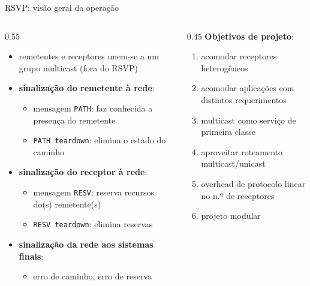 \documentclass[aspectratio=169,11pt]{beamer}
\begin{document}
\begin{frame}{RSVP: visão geral da operação}
  \begin{columns}
    \begin{column}{0.55\textwidth}
      \begin{itemize}
        \item remetentes e receptores unem-se a um grupo multicast (fora do RSVP)
        \item \textbf{sinalização do remetente à rede}:
          \begin{itemize}
            \item mensagem \texttt{PATH}: faz conhecida a presença do remetente
            \item \texttt{PATH teardown}: elimina o estado do caminho
          \end{itemize}
        \item \textbf{sinalização do receptor à rede}:
          \begin{itemize}
            \item mensagem \texttt{RESV}: reserva recursos do(s) remetente(s)
            \item \texttt{RESV teardown}: elimina reservas
          \end{itemize}
        \item \textbf{sinalização da rede aos sistemas finais}:
          \begin{itemize}
            \item erro de caminho, erro de reserva
          \end{itemize}
      \end{itemize}
    \end{column}
    \begin{column}{0.45\textwidth}
      \textbf{Objetivos de projeto}:
      \begin{enumerate}
        \item acomodar receptores heterogêneos
        \item acomodar aplicações com distintos requerimentos
        \item multicast como serviço de primeira classe
        \item aproveitar roteamento multicast/unicast
        \item overhead de protocolo linear no n.º de receptores
        \item projeto modular
      \end{enumerate}
    \end{column}
  \end{columns}
\end{frame}
\end{document}
